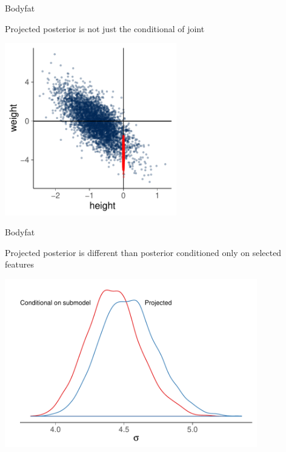 \documentclass[english,t]{beamer}
\begin{document}
\begin{frame}
  
  {\Large\color{navyblue} Bodyfat}

  Projected posterior is not just the conditional of joint
  
  \includegraphics[width=7.5cm]{bodyfat_proj_mcmc_scatter.pdf}

\end{frame}


\begin{frame}
  
  {\Large\color{navyblue} Bodyfat}

  Projected posterior is different than posterior conditioned only on selected features

  \vspace{-0.7\baselineskip}
  \includegraphics[width=11cm]{bodyfat_compare_sigmas.pdf}

\end{frame}
\end{document}
